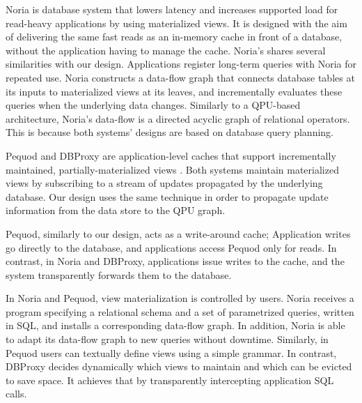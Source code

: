 Noria \cite{gjengset:noria} is database system that lowers latency and increases supported load for read-heavy applications
by using materialized views.
It is designed with the aim of delivering the same fast reads as an in-memory cache in front of a database,
without the application having to manage the cache.
Noria's shares several similarities with our design.
Applications register long-term queries with Noria for repeated use.
Noria constructs a data-flow graph that connects database tables at its inputs to materialized views at its leaves,
and incrementally evaluates these queries when the underlying data changes.
Similarly to a QPU-based architecture, Noria's data-flow is a directed acyclic graph of relational operators.
This is because both systems' designs are based on database query planning.

Pequod \cite{kate:pequod} and DBProxy \cite{amiri:dbproxy} are application-level caches that support incrementally
maintained, partially-materialized views \cite{zhou:dynamicmv}.
Both systems maintain materialized views by subscribing to a stream of updates propagated by the underlying database.
Our design uses the same technique in order to propagate update information from the data store to the QPU graph.

Pequod, similarly to our design, acts as a write-around cache;
Application writes go directly to the database, and applications access Pequod only for reads.
In contrast, in Noria and DBProxy, applications issue writes to the cache, and the system transparently forwards them to the database.

In Noria and Pequod, view materialization is controlled by users.
Noria receives a program specifying a relational schema and a set of parametrized queries, written in SQL,
and installs a corresponding data-flow graph.
In addition, Noria is able to adapt its data-flow graph to new queries without downtime.
Similarly, in Pequod users can textually define views using a simple grammar.
In contrast, DBProxy decides dynamically which views to maintain and which can be evicted to save space.
It achieves that by transparently intercepting application SQL calls.


